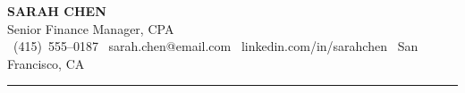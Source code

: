 \documentclass[10pt]{article}
\begin{document}
\pagecolor{pagebg}
\thispagestyle{empty}

\begin{center}
  {\color{accent}\Huge\bfseries SARAH CHEN}\\[0.12em]
  {\Large\color{dark}Senior Finance Manager, CPA}\\[0.45em]

  \footnotesize
  \faPhone\ {\color{dark}(415)\ 555--0187}\hspace{1.4em}
  \faEnvelope\ {\color{dark}sarah.chen@email.com}\hspace{1.4em}
  \faLinkedin\ {\color{dark}linkedin.com/in/sarahchen}\hspace{1.4em}
  \faMapMarker*\ {\color{dark}San Francisco, CA}
\end{center}

\vspace{0.15em}
\textcolor{lightrule}{\rule{\linewidth}{0.8pt}}
\vspace{0.45em}
\end{document}
